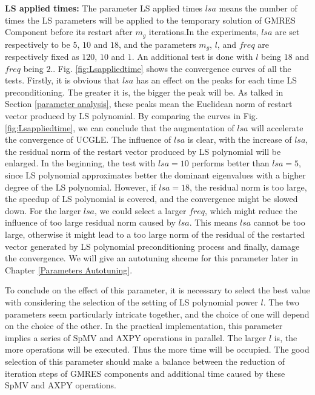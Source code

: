\textbf{LS applied times: }The parameter LS applied times $lsa$ means the number of times the LS parameters will be applied to the temporary solution of GMRES Component before its restart after $m_g$ iterations.In the experiments, $lsa$ are set respectively to be $5$, $10$ and $18$, and the parameters $m_g$, $l$, and $freq$ are respectively fixed as $120$, $10$ and $1$.  An additional test is done with $l$ being $18$ and $freq$ being $2$.. Fig. \ref{fig:Lsappliedtime} shows the convergence curves of all the tests. Firstly, it is obvious that $lsa$ has an effect on the peaks for each time LS preconditioning. The greater it is, the bigger the peak will be. As talked in Section \ref{parameter analysis}, these peaks mean the Euclidean norm of restart vector produced by LS polynomial. By comparing the curves in Fig. \ref{fig:Lsappliedtime}, we can conclude that the augmentation of $lsa$ will accelerate the convergence of UCGLE. The influence of $lsa$ is clear, with the increase of $lsa$, the residual norm of the restart vector produced by LS polynomial will be enlarged. In the beginning, the test with $lsa=10$ performs better than $lsa=5$, since LS polynomial approximates better the dominant eigenvalues with a higher degree of the LS polynomial. However, if $lsa=18$, the residual norm is too large, the speedup of LS polynomial is covered, and the convergence might be slowed down.  For the larger $lsa$, we could select a larger $freq$, which might reduce the influence of too large residual norm caused by $lsa$. This means $lsa$ cannot be too large, otherwise it might lead to a too large norm of the residual of the restarted vector generated by LS polynomial preconditioning process and finally, damage the convergence. We will give an autotuning shceme for this parameter later in Chapter \ref{Parameters Autotuning}.

To conclude on the effect of this parameter, it is necessary to select the best value with considering the selection of the setting of LS polynomial power $l$. The two parameters seem particularly intricate together, and the choice of one will depend on the choice of the other. In the practical implementation, this parameter implies a series of SpMV and AXPY operations in parallel. The larger $l$ is, the more operations will be executed. Thus the more time will be occupied. The good selection of this parameter should make a balance between the reduction of iteration steps of GMRES components and additional time caused by these SpMV and AXPY operations.

